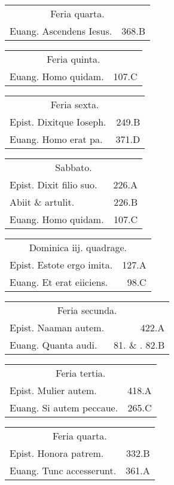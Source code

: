 \documentclass[a5paper,10pt]{book}
\begin{document}
\begin{multicols}{2}
\begin{tabular}{l r}
\multicolumn{2}{c}{\color{red} Feria quarta.}\\
Euang. Ascendens Iesus. & 368.B\\
\end{tabular}
\begin{tabular}{l r}
\multicolumn{2}{c}{\color{red} Feria quinta.}\\
Euang. Homo quidam. & 107.C\\
\end{tabular}
\begin{tabular}{l r}
\multicolumn{2}{c}{\color{red} Feria sexta.}\\
Epist. Dixitque Ioseph. & 249.B\\
Euang. Homo erat pa. & 371.D\\
\end{tabular}
\begin{tabular}{l r}
\multicolumn{2}{c}{\color{red} Sabbato.}\\
Epist. Dixit filio suo. & 226.A\\
Abiit \& artulit. & 226.B\\
Euang. Homo quidam. & 107.C\\
\end{tabular}
\begin{tabular}{l r}
\multicolumn{2}{c}{\color{red} Dominica iij. quadrage.}\\
Epist. Estote ergo imita. & 127.A\\
Euang. Et erat eiiciens. & 98.C\\
\end{tabular}
\begin{tabular}{l r}
\multicolumn{2}{c}{\color{red} Feria secunda.}\\
Epist. Naaman autem. & 422.A\\
Euang. Quanta audi. & 81. \& . 82.B\\
\end{tabular}
\begin{tabular}{l r}
\multicolumn{2}{c}{\color{red} Feria tertia.}\\
Epist. Mulier autem. & 418.A\\
Euang. Si autem peccaue. & 265.C\\
\end{tabular}
\begin{tabular}{l r}
\multicolumn{2}{c}{\color{red} Feria quarta.}\\
Epist. Honora patrem. & 332.B\\
Euang. Tunc accesserunt. & 361.A\\

\end{tabular}
\end{multicols}
\end{document}
